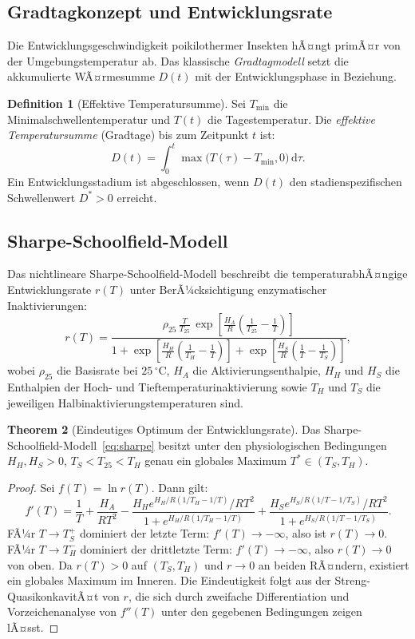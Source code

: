 ﻿\documentclass[12pt, a4paper]{article}
\theoremstyle{definition}
\newtheorem{theorem}{Theorem}[section]
\newtheorem{definition}[theorem]{Definition}
\newcommand{\dd}{\mathrm{d}}
\begin{document}
\subsection{Gradtagkonzept und Entwicklungsrate}

Die Entwicklungsgeschwindigkeit poikilothermer Insekten hÃ¤ngt primÃ¤r von der
Umgebungstemperatur ab. Das klassische \emph{Gradtagmodell} setzt die
akkumulierte WÃ¤rmesumme $D(t)$ mit der Entwicklungsphase in Beziehung.

\begin{definition}[Effektive Temperatursumme]\label{def:gradtag}
Sei $T_{\min}$ die Minimalschwellentemperatur und $T(t)$ die Tagestemperatur.
Die \emph{effektive Temperatursumme} (Gradtage) bis zum Zeitpunkt $t$ ist:
\[
  D(t) = \int_0^t \max\!\bigl(T(\tau) - T_{\min}, 0\bigr)\,\dd\tau.
\]
Ein Entwicklungsstadium ist abgeschlossen, wenn $D(t)$ den stadienspe\-zifischen
Schwellenwert $D^* > 0$ erreicht.
\end{definition}

\subsection{Sharpe-Schoolfield-Modell}

Das nichtlineare Sharpe-Schoolfield-Modell beschreibt die temperaturabhÃ¤ngige
Entwicklungsrate $r(T)$ unter BerÃ¼cksichtigung enzymatischer Inaktivierungen:
\begin{equation}\label{eq:sharpe}
  r(T) = \frac{\rho_{25}\,\frac{T}{T_{25}}\,\exp\!\!\left[\frac{H_A}{R}\!\left(\frac{1}{T_{25}}-\frac{1}{T}\right)\right]}
  {1 + \exp\!\!\left[\frac{H_H}{R}\!\left(\frac{1}{T_H}-\frac{1}{T}\right)\right]
   + \exp\!\!\left[\frac{H_S}{R}\!\left(\frac{1}{T}-\frac{1}{T_S}\right)\right]},
\end{equation}
wobei $\rho_{25}$ die Basisrate bei $25\,^\circ$C, $H_A$ die Aktivierungsenthalpie, $H_H$
und $H_S$ die Enthalpien der Hoch- und Tieftemperaturinaktivierung sowie $T_H$
und $T_S$ die jeweiligen Halbinaktivierungstemperaturen sind.

\begin{theorem}[Eindeutiges Optimum der Entwicklungsrate]\label{thm:optimum}
Das Sharpe-Schoolfield-Modell~\eqref{eq:sharpe} besitzt unter den physiologischen
Bedingungen $H_H, H_S > 0$, $T_S < T_{25} < T_H$ genau ein globales Maximum
$T^* \in (T_S, T_H)$.
\end{theorem}

\begin{proof}
Sei $f(T) = \ln r(T)$. Dann gilt:
\[
  f'(T) = \frac{1}{T} + \frac{H_A}{RT^2} - \frac{H_H e^{H_H/R(1/T_H - 1/T)}/RT^2}
  {1 + e^{H_H/R(1/T_H-1/T)}} + \frac{H_S e^{H_S/R(1/T-1/T_S)}/RT^2}
  {1 + e^{H_S/R(1/T-1/T_S)}}.
\]
FÃ¼r $T \to T_S^+$ dominiert der letzte Term: $f'(T) \to -\infty$, also ist
$r(T) \to 0$. FÃ¼r $T \to T_H^-$ dominiert der drittletzte Term: $f'(T) \to -\infty$,
also $r(T) \to 0$ von oben. Da $r(T) > 0$ auf $(T_S, T_H)$ und $r \to 0$ an
beiden RÃ¤ndern, existiert ein globales Maximum im Inneren. Die Eindeutigkeit
folgt aus der Streng-QuasikonkavitÃ¤t von $r$, die sich durch zweifache Differentiation
und Vorzeichenanalyse von $f''(T)$ unter den gegebenen Bedingungen zeigen
lÃ¤sst. \hfill
\end{proof}
\end{document}
